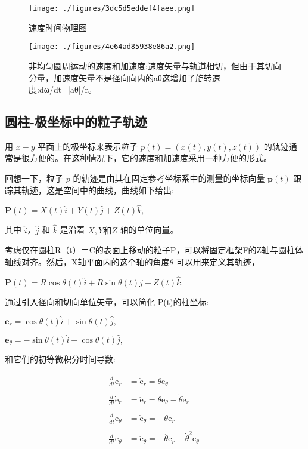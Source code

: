 \begin{figure}[ht]
\centering
\texttt{[image: ./figures/3dc5d5eddef4faee.png]}
\caption{速度时间物理图} \label{fig_YDX_8}
\end{figure}

\begin{figure}[ht]
\centering
\texttt{[image: ./figures/4e64ad85938e86a2.png]}
\caption{非均匀圆周运动的速度和加速度:速度矢量与轨道相切，但由于其切向分量，加速度矢量不是径向向内的aθ这增加了旋转速度:dω/dt=|aθ|/r。} \label{fig_YDX_9}
\end{figure}


\subsection{圆柱-极坐标中的粒子轨迹}

用 $x-y$ 平面上的极坐标来表示粒子 $p(t) = (x(t), y(t), z(t))$ 的轨迹通常是很方便的。在这种情况下，它的速度和加速度采用一种方便的形式。

回想一下，粒子 $p$ 的轨迹是由其在固定参考坐标系中的测量的坐标向量 $\mathbf{p}(t)$ 跟踪其轨迹，这是空间中的曲线，曲线如下给出:

$\mathbf{P}(t) = X(t)\hat{i} + Y(t)\hat{j} + Z(t)\hat{k},$

其中 $\hat{i}$，$\hat{j}$ 和 $\hat{k}$ 是沿着 $X, Y \text{和} Z$ 轴的单位向量。

考虑仅在圆柱R（t）＝C的表面上移动的粒子P，可以将固定框架F的Z轴与圆柱体轴线对齐。然后，X轴平面内的这个轴的角度$\theta$ 可以用来定义其轨迹，

$\mathbf{P}(t) = R \cos \theta(t) \hat{i} + R \sin \theta(t) \hat{j} + Z(t) \hat{k}.$

通过引入径向和切向单位矢量，可以简化 P(t)的柱坐标:

$\mathbf{e}_r = \cos \theta(t) \hat{i} + \sin \theta(t) \hat{j},$


$\mathbf{e}_{\theta} = -\sin \theta(t) \hat{i} + \cos \theta(t) \hat{j},$

和它们的初等微积分时间导数:

\begin{align}
\frac{d}{dt}\mathrm{e}_r &= \dot{\mathrm{e}}_r = \dot{\theta} \mathrm{e}_\theta \\\\
\frac{d}{dt}\dot{\mathrm{e}}_r &=  \ddot{\mathrm{e}}_r = \ddot{\theta} \mathrm{e}_\theta - \dot{\theta} \dot{\mathrm{e}}_r \\\\
\frac{d}{dt}\mathrm{e}_\theta &= \dot{\mathrm{e}}_\theta =  -\dot{\theta} \mathrm{e}_r \\\\
\frac{d}{dt}\dot{\mathrm{e}}_\theta &= \ddot{\mathrm{e}}_\theta = -\ddot{\theta} \mathrm{e}_r - \dot{\theta}^2 \mathrm{e}_\theta ~
\end{align}

